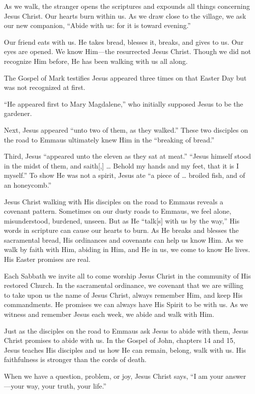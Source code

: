 \documentclass[letterpaper, 11pt]{report}
\begin{document}
As we walk, the stranger opens the scriptures and expounds all things concerning Jesus Christ. Our hearts burn within us. As we draw close to the village, we ask our new companion, “Abide with us: for it is toward evening.”

Our friend eats with us. He takes bread, blesses it, breaks, and gives to us. Our eyes are opened. We know Him—the resurrected Jesus Christ. Though we did not recognize Him before, He has been walking with us all along.

The Gospel of Mark testifies Jesus appeared three times on that Easter Day but was not recognized at first.

“He appeared first to Mary Magdalene,” who initially supposed Jesus to be the gardener.

Next, Jesus appeared “unto two of them, as they walked.” These two disciples on the road to Emmaus ultimately knew Him in the “breaking of bread.”

Third, Jesus “appeared unto the eleven as they sat at meat.” “Jesus himself stood in the midst of them, and saith[,] … Behold my hands and my feet, that it is I myself.” To show He was not a spirit, Jesus ate “a piece of … broiled fish, and of an honeycomb.”

Jesus Christ walking with His disciples on the road to Emmaus reveals a covenant pattern. Sometimes on our dusty roads to Emmaus, we feel alone, misunderstood, burdened, unseen. But as He “talk[s] with us by the way,” His words in scripture can cause our hearts to burn. As He breaks and blesses the sacramental bread, His ordinances and covenants can help us know Him. As we walk by faith with Him, abiding in Him, and He in us, we come to know He lives. His Easter promises are real.

Each Sabbath we invite all to come worship Jesus Christ in the community of His restored Church. In the sacramental ordinance, we covenant that we are willing to take upon us the name of Jesus Christ, always remember Him, and keep His commandments. He promises we can always have His Spirit to be with us. As we witness and remember Jesus each week, we abide and walk with Him.

Just as the disciples on the road to Emmaus ask Jesus to abide with them, Jesus Christ promises to abide with us. In the Gospel of John, chapters 14 and 15, Jesus teaches His disciples and us how He can remain, belong, walk with us. His faithfulness is stronger than the cords of death.

When we have a question, problem, or joy, Jesus Christ says, “I am your answer—your way, your truth, your life.”
\end{document}
